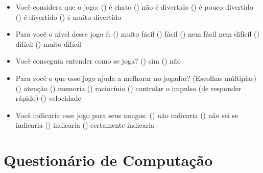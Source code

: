 \begin{itemize}
	\item Voc\^e considera que o jogo:
	\subitem () \'e chato
	\subitem () n\~{a}o \'e divertido
	\subitem () \'e pouco divertido
	\subitem () \'e divertido
	\subitem () \'e muito divertido
	\item Para voc\^e o n\'{i}vel desse jogo \'e:
	\subitem () muito f\'{a}cil
	\subitem () f\'{a}cil
	\subitem () nem f\'{a}cil nem dif\'{i}cil
	\subitem () dif\'{i}cil
	\subitem () muito dif\'{i}cil
	\item Voc\^e conseguiu entender como se joga?
	\subitem () sim
	\subitem () n\~{a}o
	\item Para voc\^e o que esse jogo ajuda a melhorar no jogador? (Escolhas m\'ultiplas)
	\subitem () aten\c{c}\~{a}o
	\subitem () memoria
	\subitem () racioc\'{i}nio
	\subitem () controlar o impulso (de responder r\'{a}pido)
	\subitem () velocidade
	\item Voc\^e indicaria esse jogo para seus amigos:
	\subitem () n\~{a}o indicaria
	\subitem () n\~{a}o sei se indicaria
	\subitem () indicaria
	\subitem () certamente indicaria
	
\end{itemize}


\section{Question\'ario de Computa\c{c}\~{a}o}
\label{ap:sec:cc}



